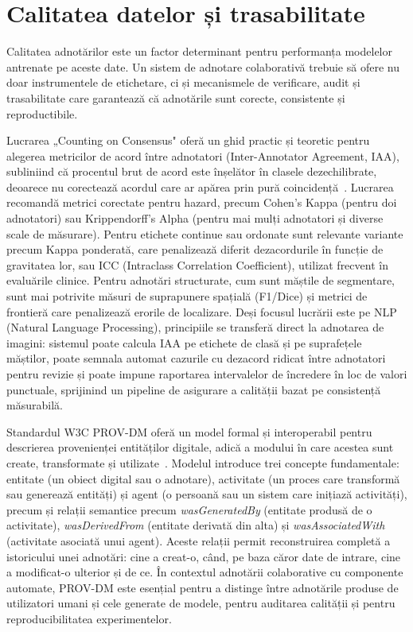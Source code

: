 \section{Calitatea datelor și trasabilitate}

Calitatea adnotărilor este un factor determinant pentru performanța modelelor antrenate pe aceste date. Un sistem de adnotare colaborativă trebuie să ofere nu doar instrumentele de etichetare, ci și mecanismele de verificare, audit și trasabilitate care garantează că adnotările sunt corecte, consistente și reproductibile.

Lucrarea „Counting on Consensus" oferă un ghid practic și teoretic pentru alegerea metricilor de acord între adnotatori (Inter-Annotator Agreement, IAA), subliniind că procentul brut de acord este înșelător în clasele dezechilibrate, deoarece nu corectează acordul care ar apărea prin pură coincidență~\cite{james2026countingconsensusselectingright}. Lucrarea recomandă metrici corectate pentru hazard, precum Cohen's Kappa (pentru doi adnotatori) sau Krippendorff's Alpha (pentru mai mulți adnotatori și diverse scale de măsurare). Pentru etichete continue sau ordonate sunt relevante variante precum Kappa ponderată, care penalizează diferit dezacordurile în funcție de gravitatea lor, sau ICC (Intraclass Correlation Coefficient), utilizat frecvent în evaluările clinice. Pentru adnotări structurate, cum sunt măștile de segmentare, sunt mai potrivite măsuri de suprapunere spațială (F1/Dice) și metrici de frontieră care penalizează erorile de localizare. Deși focusul lucrării este pe NLP (Natural Language Processing), principiile se transferă direct la adnotarea de imagini: sistemul poate calcula IAA pe etichete de clasă și pe suprafețele măștilor, poate semnala automat cazurile cu dezacord ridicat între adnotatori pentru revizie și poate impune raportarea intervalelor de încredere în loc de valori punctuale, sprijinind un pipeline de asigurare a calității bazat pe consistență măsurabilă.

Standardul W3C PROV-DM oferă un model formal și interoperabil pentru descrierea provenienței entităților digitale, adică a modului în care acestea sunt create, transformate și utilizate~\cite{Moreau2013PROVDM}. Modelul introduce trei concepte fundamentale: entitate (un obiect digital sau o adnotare), activitate (un proces care transformă sau generează entități) și agent (o persoană sau un sistem care inițiază activități), precum și relații semantice precum \textit{wasGeneratedBy} (entitate produsă de o activitate), \textit{wasDerivedFrom} (entitate derivată din alta) și \textit{wasAssociatedWith} (activitate asociată unui agent). Aceste relații permit reconstruirea completă a istoricului unei adnotări: cine a creat-o, când, pe baza căror date de intrare, cine a modificat-o ulterior și de ce. În contextul adnotării colaborative cu componente automate, PROV-DM este esențial pentru a distinge între adnotările produse de utilizatori umani și cele generate de modele, pentru auditarea calității și pentru reproducibilitatea experimentelor.

